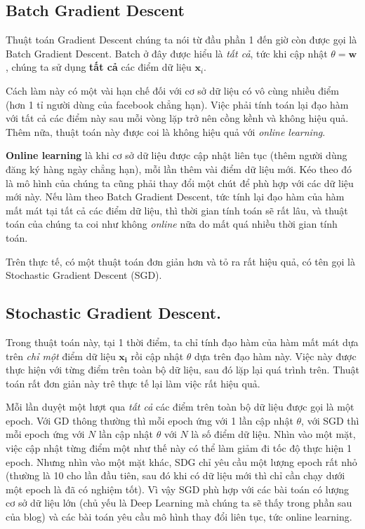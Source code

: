  
\subsection{Batch Gradient Descent }
Thuật toán Gradient Descent chúng ta nói từ đầu phần 1 đến giờ còn được gọi là Batch Gradient Descent. Batch ở đây được hiểu là \textit{tất cả}, tức khi cập nhật $\theta = \mathbf{w}$, chúng ta sử dụng \textbf{tất cả} các điểm dữ liệu $\mathbf{x}_i$.  
 
Cách làm này có một vài hạn chế đối với cơ sở dữ liệu có vô cùng nhiều điểm (hơn 1 tỉ người dùng của facebook chẳng hạn). Việc phải tính toán lại đạo hàm với tất cả các điểm này sau mỗi vòng lặp trở nên cồng kềnh và không hiệu quả. Thêm nữa, thuật toán này được coi là không hiệu quả với \textit{online learning}. 
 
 
\textbf{Online learning} là khi cơ sở dữ liệu được cập nhật liên tục (thêm người dùng đăng ký hàng ngày chẳng hạn), mỗi lần thêm vài điểm dữ liệu mới. Kéo theo đó là mô hình của chúng ta cũng phải thay đổi một chút để phù hợp với các dữ liệu mới này. Nếu làm theo Batch Gradient Descent, tức tính lại đạo hàm của hàm mất mát tại tất cả các điểm dữ liệu, thì thời gian tính toán sẽ rất lâu, và thuật toán của chúng ta coi như không \textit{online} nữa do mất quá nhiều thời gian tính toán. 
 
Trên thực tế, có một thuật toán đơn giản hơn và tỏ ra rất hiệu quả, có tên gọi là Stochastic Gradient Descent (SGD). 
 
\subsection{Stochastic Gradient Descent.}
Trong thuật toán này, tại 1 thời điểm, ta chỉ tính đạo hàm của hàm mất mát dựa trên \textit{chỉ một} điểm dữ liệu $\mathbf{x_i}$ rồi cập nhật $\theta$ dựa trên đạo hàm này. Việc này được thực hiện với từng điểm trên toàn bộ dữ liệu, sau đó lặp lại quá trình trên. Thuật toán rất đơn giản này trê thực tế lại làm việc rất hiệu quả.  
 
Mỗi lần duyệt một lượt qua \textit{tất cả} các điểm trên toàn bộ dữ liệu được gọi là một epoch. Với GD thông thường thì mỗi epoch ứng với 1 lần cập nhật $\theta$, với SGD thì mỗi epoch ứng với $N$ lần cập nhật $\theta$ với $N$ là số điểm dữ liệu. Nhìn vào một mặt, việc cập nhật từng điểm một như thế này có thể làm giảm đi tốc độ thực hiện 1 epoch. Nhưng nhìn vào một mặt khác, SDG chỉ yêu cầu một lượng epoch rất nhỏ (thường là 10 cho lần đầu tiên, sau đó khi có dữ liệu mới thì chỉ cần chạy dưới một epoch là đã có nghiệm tốt). Vì vậy SGD phù hợp với các bài toán có lượng cơ sở dữ liệu lớn (chủ yếu là Deep Learning mà chúng ta sẽ thấy trong phần sau của blog) và các bài toán yêu cầu mô hình thay đổi liên tục, tức online learning. 
 
